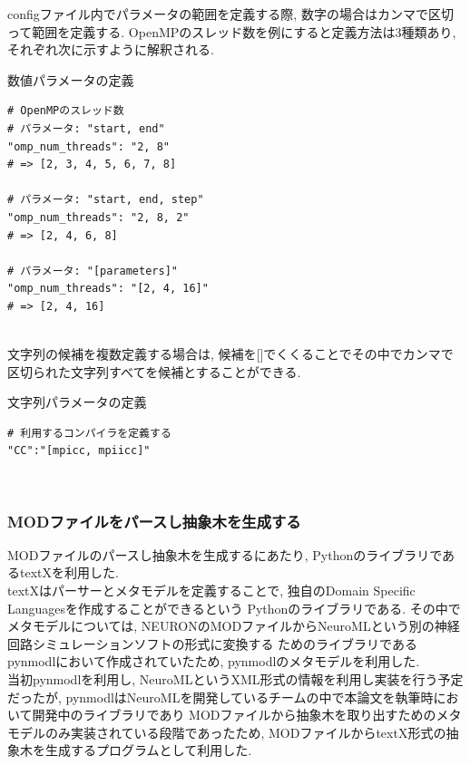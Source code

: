 \clearpage
configファイル内でパラメータの範囲を定義する際, 数字の場合はカンマで区切って範囲を定義する.
OpenMPのスレッド数を例にすると定義方法は3種類あり, それぞれ次に示すように解釈される.\\
\begin{table}[htb]
  \caption {数値パラメータの定義}
{\footnotesize
\begin{framed}
\begin{verbatim}
# OpenMPのスレッド数
# パラメータ: "start, end"
"omp_num_threads": "2, 8"
# => [2, 3, 4, 5, 6, 7, 8]

# パラメータ: "start, end, step"
"omp_num_threads": "2, 8, 2"
# => [2, 4, 6, 8]

# パラメータ: "[parameters]"
"omp_num_threads": "[2, 4, 16]"
# => [2, 4, 16]
\end{verbatim}
\end{framed}
}
\end{table}
\\

文字列の候補を複数定義する場合は,
候補を[]でくくることでその中でカンマで区切られた文字列すべてを候補とすることができる.
\begin{table}[htb]
  \caption {文字列パラメータの定義}
{\footnotesize
\begin{framed}
\begin{verbatim}
# 利用するコンパイラを定義する
"CC":"[mpicc, mpiicc]"
\end{verbatim}
\end{framed}
}
\end{table}
\\
\subsubsection{MODファイルをパースし抽象木を生成する}
\label{sec:simulator-mod-parse}
MODファイルのパースし抽象木を生成するにあたり, PythonのライブラリであるtextX\cite{textX-repo}を利用した.\\
textXはパーサーとメタモデルを定義することで, 独自のDomain Specific Languagesを作成することができるという
Pythonのライブラリである.
その中でメタモデルについては, NEURONのMODファイルからNeuroMLという別の神経回路シミュレーションソフトの形式に変換する
ためのライブラリであるpynmodl\cite{pynmodl-repo}において作成されていたため, pynmodlのメタモデルを利用した.\\
当初pynmodlを利用し, NeuroMLというXML形式の情報を利用し実装を行う予定だったが,
pynmodlはNeuroMLを開発しているチームの中で本論文を執筆時において開発中のライブラリであり
MODファイルから抽象木を取り出すためのメタモデルのみ実装されている段階であったため,
MODファイルからtextX形式の抽象木を生成するプログラムとして利用した.\\

